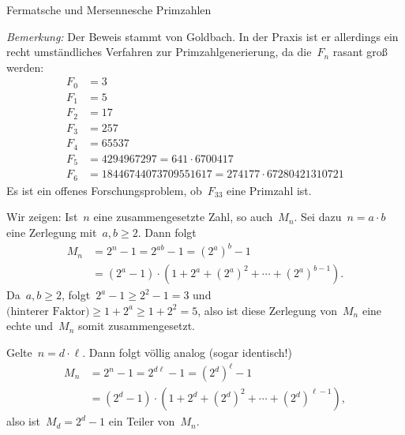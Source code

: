 \documentclass{algblatt}
\begin{document}
\begin{aufgabe}{Fermatsche und Mersennesche Primzahlen}
\begin{loesungE}
\emph{Bemerkung:} Der Beweis stammt von Goldbach. In der Praxis ist er
allerdings ein recht umständliches Verfahren zur Primzahlgenerierung, da
die~$F_n$ rasant groß werden:
\begin{align*}
  F_0 &= 3 \\
  F_1 &= 5 \\
  F_2 &= 17 \\
  F_3 &= 257 \\
  F_4 &= 65537 \\
  F_5 &= 4294967297 = 641 \cdot 6700417 \\
  F_6 &= 18446744073709551617 = 274177 \cdot 67280421310721
\end{align*}
Es ist ein offenes Forschungsproblem, ob~$F_{33}$ eine Primzahl ist.

\item Wir zeigen: Ist~$n$ eine zusammengesetzte Zahl, so auch~$M_n$. Sei
dazu~$n = a \cdot b$ eine Zerlegung mit~$a,b \geq 2$. Dann folgt
\begin{align*}
  M_n &= 2^n - 1 = 2^{ab} - 1 = (2^a)^b - 1 \\
  &= (2^a - 1) \cdot (1 + 2^a + (2^a)^2 + \cdots + (2^a)^{b-1}).
\end{align*}
Da~$a,b \geq 2$, folgt~$2^a - 1 \geq 2^2 - 1 = 3$ und~$\text{(hinterer Faktor)}
\geq 1 + 2^a \geq 1 + 2^2 = 5$, also ist diese Zerlegung von~$M_n$ eine echte
und~$M_n$ somit zusammengesetzt.

\item Gelte~$n = d \cdot \ell$. Dann folgt völlig analog (sogar identisch!)
\begin{align*}
  M_n &= 2^n - 1 = 2^{d\ell} - 1 = (2^d)^\ell - 1 \\
  &= (2^d - 1) \cdot (1 + 2^d + (2^d)^2 + \cdots + (2^d)^{\ell-1}),
\end{align*}
also ist~$M_d = 2^d - 1$ ein Teiler von~$M_n$.
\end{loesungE}
\end{aufgabe}
\end{document}
